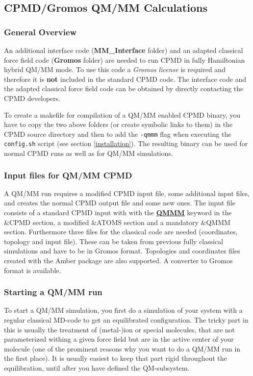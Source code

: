 \documentclass[twoside,10pt,titlepage,a4paper]{article}
\newcommand{\referto}[2]{\hyperlink{#1}{#2}}
\newcommand{\referto}[2]{\htmlref{#2}{#1}}
\newcommand{\refkeyword}[1]{%
\referto{#1}{\textbf{#1}}%
\index{#1}%
}%
\begin{document}
\subsection{CPMD/Gromos QM/MM Calculations}\label{sec:qmmm}

\subsubsection{General Overview}
\label{sec:qmmm-overview}
An additional interface code ({\bf MM\_Interface} folder) and an adapted
classical force field code  \cite{gromos96} ({\bf Gromos} folder) are
needed to run CPMD in fully Hamiltonian hybrid QM/MM
mode\cite{qmmm02}. To use this code a {\it Gromos license} is required
and therefore it is {\bf not} included in the standard CPMD code. The
interface code and the adapted classical force field code can be
obtained by directly contacting the CPMD developers.  

To create a makefile for compilation of a QM/MM enabled CPMD binary,
you have to copy  the two above folders (or create symbolic links to
them) in the CPMD source directory and then to add the \texttt{-qmmm}
flag when executing the \texttt{config.sh} script (see section
\ref{installation}).  The resulting binary can be used for normal CPMD 
runs as well as for QM/MM simulations.
%

\subsubsection{Input files for QM/MM CPMD}
\label{sec:qmmm-input}
A QM/MM run requires a modified CPMD input file, some additional
input files, and creates the normal CPMD output file and
some new ones. The input file consists of a standard CPMD input
with with the \refkeyword{QMMM} keyword in the \&CPMD section, a
modified \&ATOMS section and a mandatory \&QMMM section. Furthermore
three files for the classical code are needed (coordinates, topology and
input file). These can be taken from previous fully classical
simulations and have to be in Gromos format. Topologies and
coordinates files created with the Amber\cite{amber7} package are
also supported. A converter to Gromos format\cite{gromos96} is available.

\subsubsection{Starting a QM/MM run}
\label{sec:qmmm-start}
To start a QM/MM simulation, you first do a simulation of your
system with a regular classical MD-code to get an equilibrated
configuration. The tricky part in this is usually the treatment
of (metal-)ion or special molecules, that are not parameterized
withing a given force field but are in the active center of your
molecule (one of the prominent reasons why you want to do a QM/MM
run in the first place). It is usually easiest to keep that part
rigid throughout the equilibration, until after you have defined
the QM-subsystem.
\end{document}
